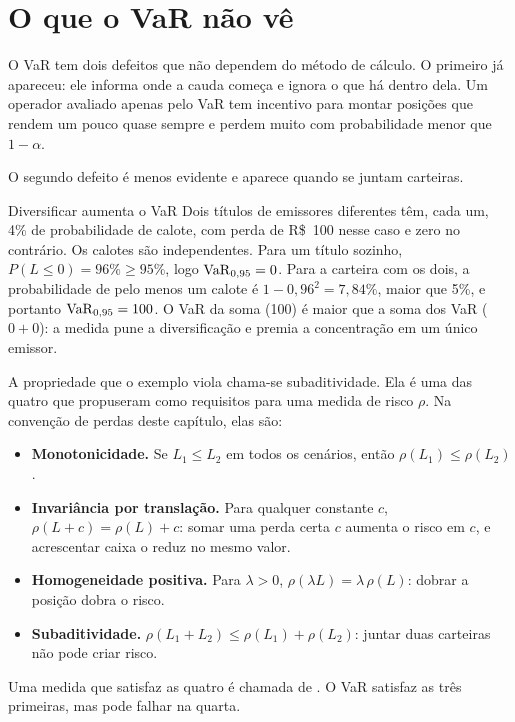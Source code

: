 \section{O que o VaR não vê}

O VaR tem dois defeitos que não dependem do método de cálculo. O primeiro já apareceu: ele informa onde a cauda começa e ignora o que há dentro dela. Um operador avaliado apenas pelo VaR tem incentivo para montar posições que rendem um pouco quase sempre e perdem muito com probabilidade menor que $1-\alpha$.

O segundo defeito é menos evidente e aparece quando se juntam carteiras.

\begin{exemplo}{Diversificar aumenta o VaR}
Dois títulos de emissores diferentes têm, cada um, 4\% de probabilidade de calote, com perda de R\$~100 nesse caso e zero no contrário. Os calotes são independentes. Para um título sozinho, $P(L \le 0) = 96\% \ge 95\%$, logo $\operatorname{VaR}_{0,95} = 0$. Para a carteira com os dois, a probabilidade de pelo menos um calote é $1 - 0,96^2 = 7,84\%$, maior que 5\%, e portanto $\operatorname{VaR}_{0,95} = 100$. O VaR da soma (100) é maior que a soma dos VaR ($0 + 0$): a medida pune a diversificação e premia a concentração em um único emissor.
\end{exemplo}

A propriedade que o exemplo viola chama-se subaditividade. Ela é uma das quatro que \citet{artzner1999} propuseram como requisitos para uma medida de risco $\rho$. Na convenção de perdas deste capítulo, elas são:

\begin{itemize}
  \item \textbf{Monotonicidade.} Se $L_1 \le L_2$ em todos os cenários, então $\rho(L_1) \le \rho(L_2)$.
  \item \textbf{Invariância por translação.} Para qualquer constante $c$, $\rho(L + c) = \rho(L) + c$: somar uma perda certa $c$ aumenta o risco em $c$, e acrescentar caixa o reduz no mesmo valor.
  \item \textbf{Homogeneidade positiva.} Para $\lambda > 0$, $\rho(\lambda L) = \lambda\,\rho(L)$: dobrar a posição dobra o risco.
  \item \textbf{Subaditividade.} $\rho(L_1 + L_2) \le \rho(L_1) + \rho(L_2)$: juntar duas carteiras não pode criar risco.
\end{itemize}

Uma medida que satisfaz as quatro é chamada de . O VaR satisfaz as três primeiras, mas pode falhar na quarta.


